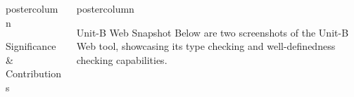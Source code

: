 \documentclass{beamer}
\newlength{\columnheight}
\begin{document}
\begin{frame}
\begin{columns}
\begin{column}{.3\textwidth}
\begin{beamercolorbox}[center]{postercolumn}
\begin{minipage}{.98\textwidth}
{\begin{myblock}{Significance \& Contributions}
          \end{myblock}\vfill
    }\end{minipage}\end{beamercolorbox}
  \end{column}
  \begin{column}{.4\textwidth}
    \begin{beamercolorbox}[center]{postercolumn}
      \begin{minipage}{.98\textwidth}  %
        \parbox[t][\columnheight]{\textwidth}{ %
          \begin{myblock}{Unit-B Web Snapshot}
            Below are two screenshots of the Unit-B Web tool, showcasing its
            type checking and well-definedness checking capabilities.


\end{myblock}}
\end{minipage}
\end{beamercolorbox}
\end{column}
\end{columns}
\end{frame}
\end{document}

